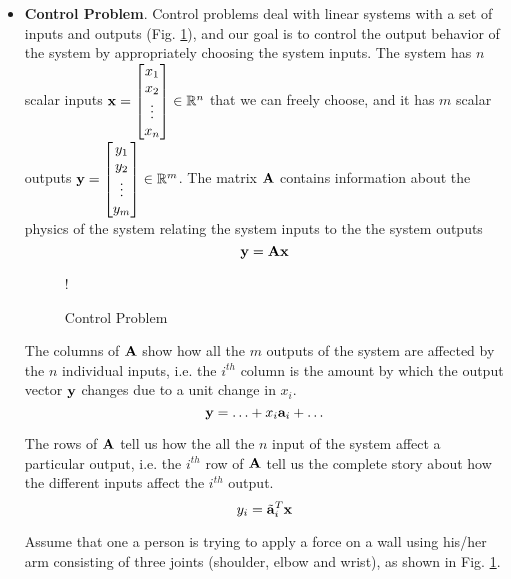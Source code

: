 \begin{itemize}
    \item \textbf{Control Problem}. Control problems deal with linear systems with a set of inputs and outputs (Fig. \ref{fig:controlprob}), and our goal is to control the output behavior of the system by appropriately choosing the system inputs. The system has $n$ scalar inputs $\mf{x} = \bmxc x_1\\ x_2 \\ \vdots \\ x_n\emx \in \mb{R}^n$ that we can freely choose, and it has $m$ scalar outputs $\mf{y} = \bmxc y_1\\ y_2 \\ \vdots \\ y_m\emx \in \mb{R}^m$. The matrix $\mathbf{A}$ contains information about the physics of the system relating the system inputs to the the system outputs   
    \[ \mathbf{y} = \mathbf{A}\mathbf{x} \]
    \begin{figure}[h!]
        \centering
        \resizebox {0.7\columnwidth} {!} {
        }
        \caption{Control Problem}
        \label{fig:controlprob}
    \end{figure}

    The columns of $\mathbf{A}$ show how all the $m$ outputs of the system are affected by the $n$ individual inputs, i.e. the $i^{th}$ column is the amount by which the output vector $\mathbf{y}$ changes due to a unit change in $x_i$. 
    \[ \mathbf{y} = \ldots + x_i \mathbf{a}_i + \ldots \]

    The rows of $\mathbf{A}$ tell us how the all the $n$ input of the system affect a particular output, i.e. the $i^{th}$ row of $\mathbf{A}$ tell us the complete story about how the different inputs affect the $i^{th}$ output.
    \[ y_i = \tilde{\mathbf{a}}_i^T\mathbf{x} \]

    \setcounter{example}{0}
    \begin{example}[frametitle=Applying a force on an object through a multi-joint system]\label{ex:control}
    Assume that one a person is trying to apply a force on a wall using his/her arm consisting of three joints (shoulder, elbow and wrist), as shown in Fig. \ref{fig:controlprob}.


\end{example}
\end{itemize}

